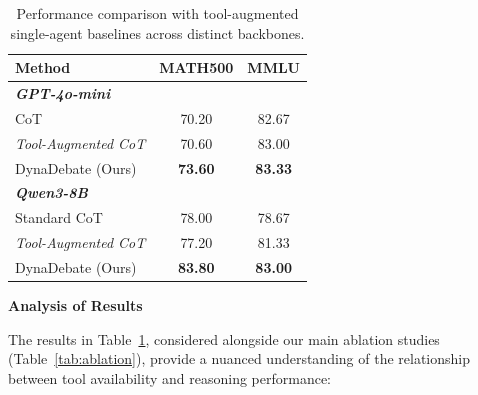 \begin{table}[h]
\centering
\small
\begin{tabular}{lcc}
\toprule
\textbf{Method} & \textbf{MATH500} & \textbf{MMLU} \\
\midrule
\multicolumn{3}{l}{\textit{\textbf{GPT-4o-mini}}} \\
CoT & 70.20 & 82.67 \\
\textit{Tool-Augmented CoT} & 70.60 & 83.00 \\
DynaDebate (Ours) & \textbf{73.60} & \textbf{83.33} \\
\midrule
\multicolumn{3}{l}{\textit{\textbf{Qwen3-8B}}} \\
Standard CoT & 78.00 & 78.67 \\
\textit{Tool-Augmented CoT} & 77.20 & 81.33 \\
DynaDebate (Ours) & \textbf{83.80} & \textbf{83.00} \\
\bottomrule
\end{tabular}
\caption{Performance comparison with tool-augmented single-agent baselines across distinct backbones.}
\label{tab:tool_ablation}
\end{table}

\noindent\textbf{Analysis of Results}

The results in Table~\ref{tab:tool_ablation}, considered alongside our main ablation studies (Table~\ref{tab:ablation}), provide a nuanced understanding of the relationship between tool availability and reasoning performance:

